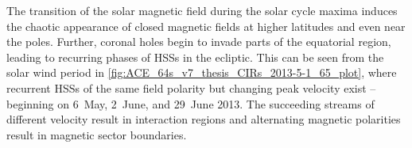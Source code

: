 The transition of the solar magnetic field during the solar cycle maxima induces the chaotic appearance of closed magnetic fields at higher latitudes and even near the poles. Further, coronal holes begin to invade parts of the equatorial region, leading to recurring phases of HSSs in the ecliptic. This can be seen from the solar wind period in \autoref{fig:ACE_64s_v7_thesis_CIRs_2013-5-1_65_plot}, where recurrent HSSs of the same field polarity but changing peak velocity exist -- beginning on 6~May, 2~June, and 29~June 2013. The succeeding streams of different velocity result in interaction regions and alternating magnetic polarities result in magnetic sector boundaries.


